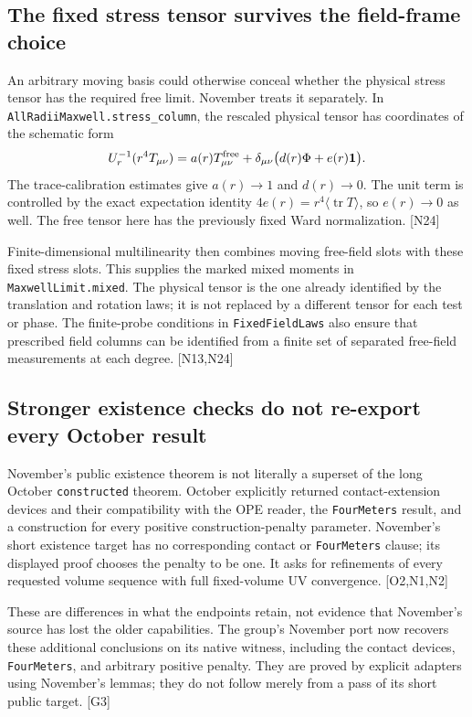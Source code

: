 \documentclass[11pt]{article}
\newcommand{\code}[1]{{\small\nolinkurl{#1}}}
\newcommand{\src}[1]{\textsf{[#1]}}
\begin{document}
\subsection{The fixed stress tensor survives the field-frame choice}

An arbitrary moving basis could otherwise conceal whether the physical
stress tensor has the required free limit. November treats it separately.
In \code{AllRadiiMaxwell.stress_column}, the rescaled physical tensor has
coordinates of the schematic form
\[
 U_r^{-1}(r^4T_{\mu\nu})
 =a(r)T^{\rm free}_{\mu\nu}
   +\delta_{\mu\nu}\bigl(d(r)\Phi+e(r)\mathbf1\bigr).
\]
The trace-calibration estimates give $a(r)\to1$ and $d(r)\to0$.
The unit term is controlled by the exact expectation identity
$4e(r)=r^4\langle\operatorname{tr}T\rangle$, so $e(r)\to0$ as well.
The free tensor here has the previously fixed Ward normalization.
\src{N24}

Finite-dimensional multilinearity then combines moving free-field slots
with these fixed stress slots. This supplies the marked mixed moments
in \code{MaxwellLimit.mixed}. The physical tensor is the one already
identified by the translation and rotation laws; it is not replaced by
a different tensor for each test or phase. The finite-probe conditions
in \code{FixedFieldLaws} also ensure that prescribed field columns can
be identified from a finite set of separated free-field measurements at
each degree. \src{N13,N24}

\subsection{Stronger existence checks do not re-export every October result}

November's public existence theorem is not literally a superset of the
long October \code{constructed} theorem. October explicitly returned
contact-extension devices and their compatibility with the OPE reader,
the \code{FourMeters} result, and a construction for every positive
construction-penalty parameter. November's short existence target has no
corresponding contact or \code{FourMeters} clause; its displayed proof
chooses the penalty to be one. It asks for refinements of every requested
volume sequence with full fixed-volume UV convergence. \src{O2,N1,N2}

These are differences in what the endpoints retain, not evidence that
November's source has lost the older capabilities. The group's November
port now recovers these additional conclusions on its native witness,
including the contact devices, \code{FourMeters}, and arbitrary positive
penalty. They are proved by explicit adapters using November's lemmas;
they do not follow merely from a pass of its short public target. \src{G3}
\end{document}
